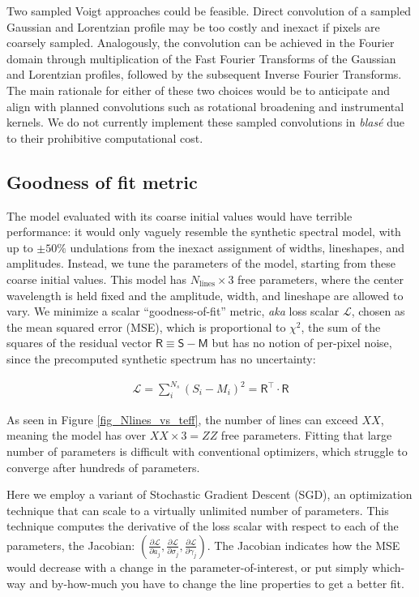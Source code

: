 \documentclass[modern]{aastex631}
\begin{document}
Two sampled Voigt approaches could be feasible.  Direct convolution of a sampled Gaussian and Lorentzian profile may be too costly and inexact if pixels are coarsely sampled.  Analogously, the convolution can be achieved in the Fourier domain through multiplication of the Fast Fourier Transforms of the Gaussian and Lorentzian profiles, followed by the subsequent Inverse Fourier Transforms.  The main rationale for either of these two choices would be to anticipate and align with planned convolutions such as rotational broadening and instrumental kernels.  We do not currently implement these sampled convolutions in \emph{blas\'e} due to their prohibitive computational cost.


\subsection{Goodness of fit metric}
The model evaluated with its coarse initial values would have terrible performance: it would only vaguely resemble the synthetic spectral model, with up to $\pm 50\%$ undulations from the inexact assignment of widths, lineshapes, and amplitudes.  Instead, we tune the parameters of the model, starting from these coarse initial values.  This model has $N_{\mathrm{lines}}\times 3$ free parameters, where the center wavelength is held fixed and the amplitude, width, and lineshape are allowed to vary.  We minimize a scalar ``goodness-of-fit'' metric, \emph{aka} loss scalar $\mathcal{L}$, chosen as the mean squared error (MSE), which is proportional to $\chi^2$, the sum of the squares of the residual vector $\mathsf{R} \equiv \mathsf{S}-\mathsf{M}$ but has no notion of per-pixel noise, since the precomputed synthetic spectrum has no uncertainty:

\begin{eqnarray}
  \mathcal{L} = \sum_i^{N_s} (S_i - M_i)^2 = \mathsf{R^\intercal}\cdot \mathsf{R}
\end{eqnarray}


As seen in Figure \ref{fig_Nlines_vs_teff}, the number of lines can exceed $XX$, meaning the model has over $XX \times 3 = ZZ$ free parameters.  Fitting that large number of parameters is difficult with conventional optimizers, which struggle to converge after hundreds of parameters.

Here we employ a variant of Stochastic Gradient Descent (SGD), an optimization technique that can scale to a virtually unlimited number of parameters.  This technique computes the derivative of the loss scalar with respect to each of the parameters, the Jacobian: $(\frac{\partial \mathcal{L}}{\partial a_j}, \frac{\partial \mathcal{L}}{\partial \sigma_j}, \frac{\partial \mathcal{L}}{\partial \gamma_j})$.  The Jacobian indicates how the MSE would decrease with a change in the parameter-of-interest, or put simply which-way and by-how-much you have to change the line properties to get a better fit.
\end{document}
